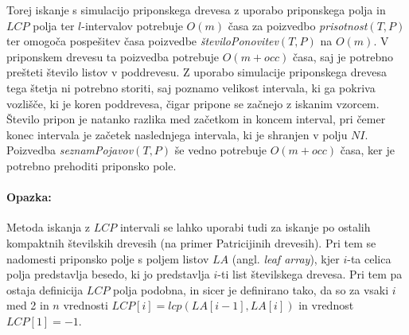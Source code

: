 Torej iskanje s simulacijo priponskega drevesa z uporabo priponskega polja in $LCP$ polja ter $l$-intervalov potrebuje $O(m)$ časa za poizvedbo \textit{prisotnost}$(T,P)$ ter omogoča pospešitev časa poizvedbe \textit{številoPonovitev}$(T,P)$ na $O(m)$. V priponskem drevesu ta poizvedba potrebuje $O(m+occ)$ časa, saj je potrebno prešteti število listov v poddrevesu. Z uporabo simulacije priponskega drevesa tega štetja ni potrebno storiti, saj poznamo velikost intervala, ki ga pokriva vozlišče, ki je koren poddrevesa, čigar pripone se začnejo z iskanim vzorcem. Število pripon je natanko razlika med začetkom in koncem interval, pri čemer konec intervala je začetek naslednjega intervala, ki je shranjen v polju $NI$. Poizvedba \textit{seznamPojavov}$(T,P)$ še vedno potrebuje $O(m+occ)$ časa, ker je potrebno prehoditi priponsko pole.

\paragraph{Opazka:}
Metoda iskanja z $LCP$ intervali se lahko uporabi tudi za iskanje po ostalih kompaktnih številskih drevesih (na primer Patricijinih drevesih). Pri tem se nadomesti priponsko polje s poljem listov $LA$ (angl. \textit{leaf array}), kjer $i$-ta celica polja predstavlja besedo, ki jo predstavlja $i$-ti list številskega drevesa. Pri tem pa ostaja definicija $LCP$ polja podobna, in sicer je definirano tako, da so za vsaki $i$ med 2 in $n$ vrednosti $LCP[i]=lcp(LA[i-1],LA[i])$ in vrednost $LCP[1]=-1$.
